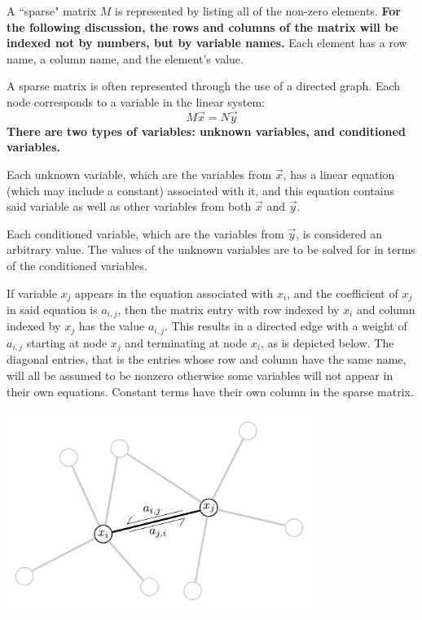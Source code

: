 \documentclass{article}
\begin{document}
A ``sparse" matrix \(M\) is represented by listing all of the non-zero elements. {\bf For the following discussion, the rows and columns of the matrix will be indexed not by numbers, but by variable names.} Each element has a row name, a column name, and the element's value. 

A sparse matrix is often represented through the use of a directed graph. Each node corresponds to a variable in the linear system: 
\[M\vec{x} = N\vec{y}\]
{\bf There are two types of variables: unknown variables, and conditioned variables.} 

Each unknown variable, which are the variables from \(\vec{x}\), has a linear equation (which may include a constant) associated with it, and this equation contains said variable as well as other variables from both \(\vec{x}\) and \(\vec{y}\). 

Each conditioned variable, which are the variables from \(\vec{y}\), is considered an arbitrary value. The values of the unknown variables are to be solved for in terms of the conditioned variables.

If variable \(x_j\) appears in the equation associated with \(x_i\), and the coefficient of \(x_j\) in said equation is \(a_{i,j}\), then the matrix entry with row indexed by \(x_i\) and column indexed by \(x_j\) has the value \(a_{i,j}\). This results in a directed edge with a weight of \(a_{i,j}\) starting at node \(x_j\) and terminating at node \(x_i\), as is depicted below. The diagonal entries, that is the entries whose row and column have the same name, will all be assumed to be nonzero otherwise some variables will not appear in their own equations. Constant terms have their own column in the sparse matrix.    

\begin{center} 
\includegraphics[width = 0.75\textwidth]{directed_graph_computational_mesh}
\end{center}
\end{document}
